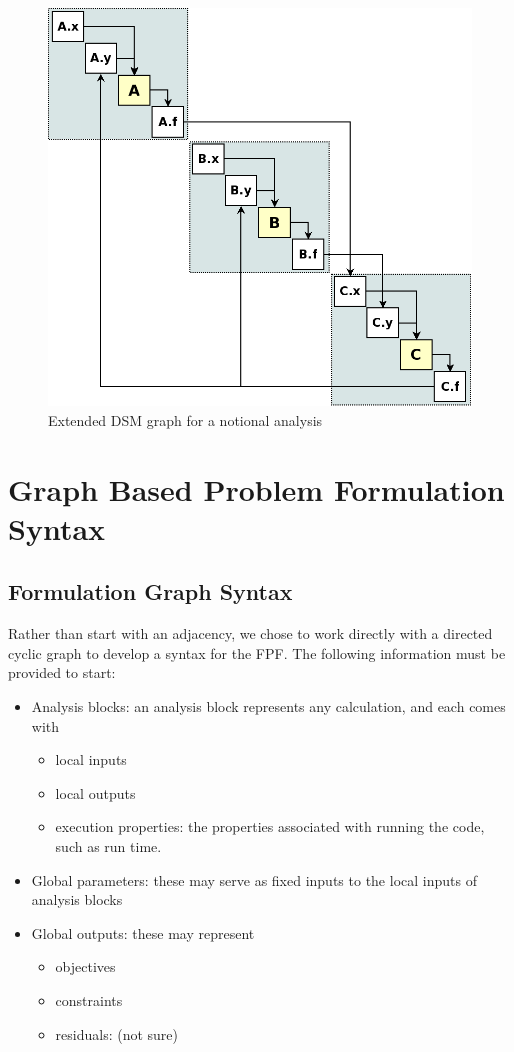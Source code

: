     \begin{figure}[!hbp]
        \begin{center}
        \includegraphics[width=.75\textwidth]{images/dsm_full}
        \caption{Extended DSM graph for a notional analysis \label{fig:dsm_full}}
        \end{center}
    \end{figure}

    
\section{Graph Based Problem Formulation Syntax}
    \subsection{Formulation Graph Syntax}
    Rather than start with an adjacency, we chose to work directly with a directed cyclic graph to develop a syntax for the FPF. 
    The following information must be provided to start:
    \begin{itemize}
        \item Analysis blocks: an analysis block represents any calculation, and each comes with
            \begin{itemize}
                \item local inputs
                \item local outputs 
                \item execution properties: the properties associated with running the code, such as run time.
            \end{itemize}
        \item Global parameters: these may serve as fixed inputs to the local inputs of analysis blocks
        \item Global outputs: these may represent
            \begin{itemize}
                \item objectives
                \item constraints
                \item residuals: (not sure)
            \end{itemize}
    \end{itemize}

